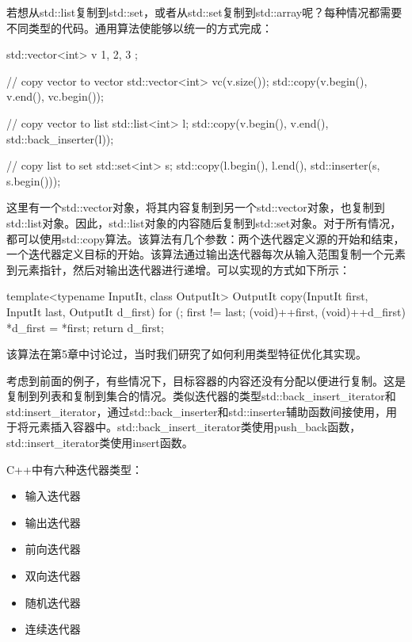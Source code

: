 若想从std::list复制到std::set，或者从std::set复制到std::array呢？每种情况都需要不同类型的代码。通用算法使能够以统一的方式完成：

\begin{cppcode}
std::vector<int> v{ 1, 2, 3 };

// copy vector to vector
std::vector<int> vc(v.size());
std::copy(v.begin(), v.end(), vc.begin());

// copy vector to list
std::list<int> l;
std::copy(v.begin(), v.end(), std::back_inserter(l));

// copy list to set
std::set<int> s;
std::copy(l.begin(), l.end(), std::inserter(s, s.begin()));
\end{cppcode}

这里有一个std::vector对象，将其内容复制到另一个std::vector对象，也复制到std::list对象。因此，std::list对象的内容随后复制到std::set对象。对于所有情况，都可以使用std::copy算法。该算法有几个参数：两个迭代器定义源的开始和结束，一个迭代器定义目标的开始。该算法通过输出迭代器每次从输入范围复制一个元素到元素指针，然后对输出迭代器进行递增。可以实现的方式如下所示：

\begin{cppcode}
template<typename InputIt, class OutputIt>
OutputIt copy(InputIt first, InputIt last,
			  OutputIt d_first)
{
	for (; first != last; (void)++first, (void)++d_first)
	{
		*d_first = *first;
	}
	return d_first;
}
\end{cppcode}

\begin{important}
  该算法在第5章中讨论过，当时我们研究了如何利用类型特征优化其实现。
\end{important}

考虑到前面的例子，有些情况下，目标容器的内容还没有分配以便进行复制。这是复制到列表和复制到集合的情况。类似迭代器的类型std::back_insert_iterator和std:insert_iterator，通过std::back_inserter和std::inserter辅助函数间接使用，用于将元素插入容器中。std::back_insert_iterator类使用push_back函数，std::insert_iterator类使用insert函数。

C++中有六种迭代器类型：

\begin{itemize}
  \item 输入迭代器
  \item 输出迭代器
  \item 前向迭代器
  \item 双向迭代器
  \item 随机迭代器
  \item 连续迭代器
\end{itemize}

